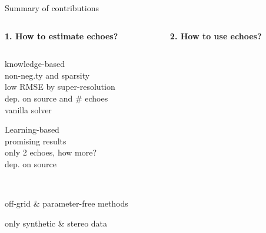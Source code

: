 \begin{frame}{Summary of contributions}


    \vfill
    \begin{columns}[T,onlytextwidth]
        \begin{column}{0.48\textwidth}
            \centering
            \textbf{1. How to estimate echoes?}
        \end{column}
        \begin{column}{0.48\textwidth}
            \centering
            \textbf{2. How to use echoes?}
        \end{column}
    \end{columns}

    \pause
    \begin{columns}[T]
        \begin{column}{0.48\textwidth}
            \begin{description}
                \item[\blaster:] knowledge-based{\footnotesize%
                \\\cmark{} non-neg.ty and sparsity
                \\\cmark{} low RMSE by super-resolution
                \\\xmark{} dep. on source and \# echoes
                \\\xmark{} vanilla solver}

                \pause
                \item[\lantern:] Learning-based {\footnotesize
                \\\cmark{} promising results
                \\\xmark{} only 2 echoes, how more?
                \\\xmark{} dep. on source}

                \pause
                \item[both:] \\{\footnotesize
                \item[\cmark] off-grid \& parameter-free methods
                \item[\xmark] only synthetic \& stereo data
                }
            \end{description}
        \end{column}


\end{columns}
\end{frame}
